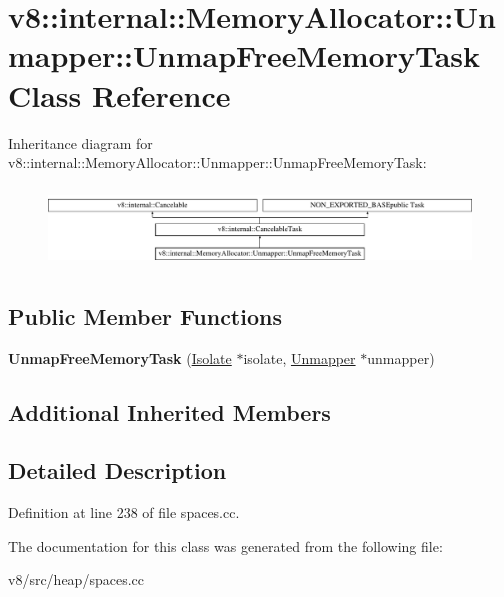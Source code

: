 \hypertarget{classv8_1_1internal_1_1MemoryAllocator_1_1Unmapper_1_1UnmapFreeMemoryTask}{}\section{v8\+:\+:internal\+:\+:Memory\+Allocator\+:\+:Unmapper\+:\+:Unmap\+Free\+Memory\+Task Class Reference}
\label{classv8_1_1internal_1_1MemoryAllocator_1_1Unmapper_1_1UnmapFreeMemoryTask}
Inheritance diagram for v8\+:\+:internal\+:\+:Memory\+Allocator\+:\+:Unmapper\+:\+:Unmap\+Free\+Memory\+Task\+:\begin{figure}[H]
\begin{center}
\leavevmode
\includegraphics[height=2.148338cm]{classv8_1_1internal_1_1MemoryAllocator_1_1Unmapper_1_1UnmapFreeMemoryTask}
\end{center}
\end{figure}
\subsection*{Public Member Functions}
\begin{DoxyCompactItemize}
\item 
\mbox{\label{classv8_1_1internal_1_1MemoryAllocator_1_1Unmapper_1_1UnmapFreeMemoryTask_a734ad7ca4ebac219acaf1fc420a3d885}} 
{\bfseries Unmap\+Free\+Memory\+Task} (\mbox{\hyperlink{classv8_1_1internal_1_1Isolate}{Isolate}} $\ast$isolate, \mbox{\hyperlink{classv8_1_1internal_1_1MemoryAllocator_1_1Unmapper}{Unmapper}} $\ast$unmapper)
\end{DoxyCompactItemize}
\subsection*{Additional Inherited Members}


\subsection{Detailed Description}


Definition at line 238 of file spaces.\+cc.



The documentation for this class was generated from the following file\+:\begin{DoxyCompactItemize}
\item 
v8/src/heap/spaces.\+cc\end{DoxyCompactItemize}
